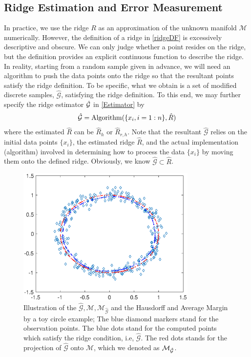 \documentclass[aos,preprint]{imsart}
\theoremstyle{remark}
\begin{document}
\subsection{Ridge Estimation and Error Measurement}
In practice, we use the ridge $R$ as an approximation of the unknown manifold $\mathcal M$ numerically. However, the definition of a ridge in \eqref{ridgeDF} is excessively descriptive and obscure. We can only judge whether a point resides on the ridge, but the definition provides an explicit continuous function to describe the ridge. In reality, starting from a random sample given in advance, we will need an algorithm to push the data points onto the ridge so that the resultant points satisfy the ridge definition. To be specific, what we obtain is a set of modified discrete samples, $\hat{\mathcal G}$, satisfying the ridge definition. To this end, we may further specify the ridge estimator $\hat{\cal G}$ in \eqref{Estimator} by
\[
\hat{\mathcal G} = {\rm Algorithm}(\{x_i, i=1:n\},  \hat{R})
\]
where the estimated $\hat{R}$ can be $\hat{R}_h$ or $\hat{R}_{r,h}$. Note that the resultant $\hat{\mathcal G}$ relies on the initial data points $\{x_i\}$, the estimated ridge $\hat{R}$, and the actual implementation (algorithm) involved in determining how to process the data $\{x_i\}$ by moving them onto the defined ridge. Obviously, we know $\hat{\mathcal G} \subset \hat{R}$.
\begin{figure}[htbp] %
   \centering
   \includegraphics[width=3.5in]{introduction_demo.eps} 
   \caption{Illustration of the $\hat{\mathcal G},\mathcal M, \mathcal M_{\hat{\mathcal G}}$ and the Hausdorff and Average Margin by a toy circle example; The blue diamond markers stand for the observation points. The blue dots stand for the computed points which satisfy the ridge condition, i.e, $\hat{\mathcal G}$. The red dots stands for the projection of $\hat{\mathcal G}$ onto $\mathcal M$, which we denoted as $\cal M_{\hat{G}}$. }
   \label{fig:example}
\end{figure}
\end{document}
